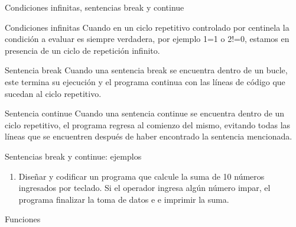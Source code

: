 \documentclass[xcolor=pdftex,table,11pt]{beamer}
\begin{document}
\begin{frame}{Condiciones infinitas, sentencias break y continue}

\begin{block}{Condiciones infinitas}
Cuando en un ciclo repetitivo controlado por centinela la condición a evaluar es siempre verdadera, por ejemplo 1=1 o  2!=0, estamos en presencia de un ciclo de repetición infinito.
\end{block}

\begin{block}{Sentencia break}
Cuando una sentencia break se encuentra dentro de un bucle, este termina su ejecución y el programa continua con las líneas de código que sucedan al ciclo repetitivo.
\end{block}

\begin{block}{Sentencia continue}
Cuando una sentencia continue se encuentra dentro de un ciclo repetitivo, el programa regresa al comienzo del mismo, evitando todas las líneas que se encuentren después de haber encontrado la sentencia mencionada. 
\end{block}

\end{frame}


\begin{frame}{Sentencias break y continue: ejemplos}
 \begin{enumerate}
   
     \item Diseñar y codificar un programa que calcule la suma de 10 números ingresados por teclado. Si el operador ingresa algún número impar, el programa finalizar la toma de datos e e imprimir la suma. \\
\href{https://github.com/danis963/informaticaI_IUA/blob/main/c/src/3-4-for.c}{}

   \end{enumerate}
\end{frame}

\begin{frame}{Funciones}
\end{frame}
\end{document}

